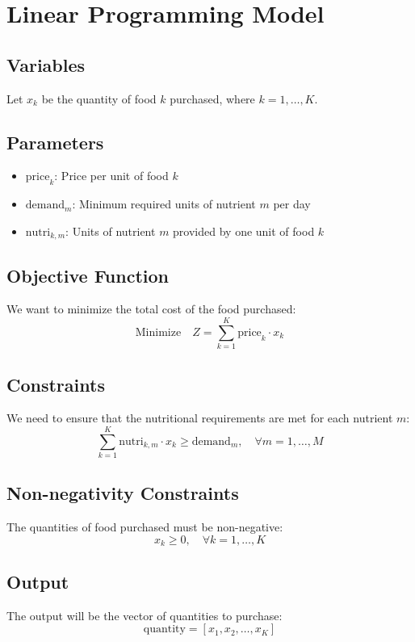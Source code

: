 \documentclass{article}
\begin{document}
\section*{Linear Programming Model}

\subsection*{Variables}
Let \( x_k \) be the quantity of food \( k \) purchased, where \( k = 1, \ldots, K \).

\subsection*{Parameters}
\begin{itemize}
    \item \( \text{price}_k \): Price per unit of food \( k \)
    \item \( \text{demand}_m \): Minimum required units of nutrient \( m \) per day
    \item \( \text{nutri}_{k,m} \): Units of nutrient \( m \) provided by one unit of food \( k \)
\end{itemize}

\subsection*{Objective Function}
We want to minimize the total cost of the food purchased:
\[
\text{Minimize} \quad Z = \sum_{k=1}^{K} \text{price}_k \cdot x_k
\]

\subsection*{Constraints}
We need to ensure that the nutritional requirements are met for each nutrient \( m \):
\[
\sum_{k=1}^{K} \text{nutri}_{k,m} \cdot x_k \geq \text{demand}_m, \quad \forall m = 1, \ldots, M
\]

\subsection*{Non-negativity Constraints}
The quantities of food purchased must be non-negative:
\[
x_k \geq 0, \quad \forall k = 1, \ldots, K
\]

\subsection*{Output}
The output will be the vector of quantities to purchase:
\[
\text{quantity} = \left[ x_1, x_2, \ldots, x_K \right]
\]
\end{document}
